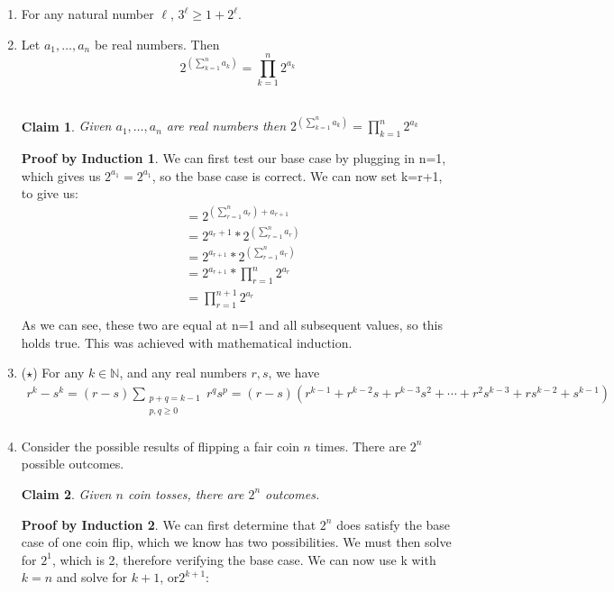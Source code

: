 \documentclass[11pt]{letter}
\newtheorem{claim}{Claim}
\theoremstyle{definition}
\newtheorem{PBI}{Proof by Induction}
\begin{document}
\begin{description}
\begin{enumerate}
			\item For any natural number $\ell$, $3^\ell\geq 1+2^\ell$.
			\item Let $a_1,\ldots, a_n$ be real numbers. Then
				$$2^{\left(\sum_{k=1}^n a_k\right)}=\prod_{k=1}^n 2^{a_k}$$ \\
\begin{claim}
Given $a_1,\ldots, a_n$ are real numbers then $2^{\left(\sum_{k=1}^n a_k\right)}=\prod_{k=1}^n 2^{a_k}$ \\
\end{claim}
\begin{PBI}
We can first test our base case by plugging in n=1, which gives us $2^{a_1}=2^{a_1}$, so the base case is correct. We can now set k=r+1, to give us: \\
\begin{align*}
&=2^{\left(\sum_{r=1}^n a_{r}\right) +a_{r+1}} \tag{replaces k with r+1} \\
&=2^{a_r+1}*2^{\left(\sum_{r=1}^n a_{r}\right)} \\
&=2^{a_{r+1}}*2^{\left(\sum_{r=1}^n a_{r}\right)} \\
&=2^{a_{r+1}}*\prod_{r=1}^n 2^{a_r} \\
&=\prod_{r=1}^{n+1} 2^{a_r} \\
\end{align*}
As we can see, these two are equal at n=1 and all subsequent values, so this holds true. This was achieved with mathematical induction. \\
\end{PBI}
			\item ($\star$) For any $k\in\mathbb{N}$, and any real numbers $r,s$, we have 
				\begin{align*}
					r^k-s^k=(r-s)\sum_{\substack{p+q=k-1\\p,q\geq 0}} r^qs^p=(r-s)\left(r^{k-1}+r^{k-2}s+r^{k-3}s^2+\cdots+r^2s^{k-3}+rs^{k-2}+s^{k-1}\right) \\
				\end{align*}
			\item Consider the possible results of flipping a fair coin $n$ times. There are $2^n$ possible outcomes. 
\begin{claim}
Given $n$ coin tosses, there are $2^n$ outcomes.
\end{claim}
\begin{PBI}
We can first determine that $2^n$ does satisfy the base case of one coin flip, which we know has two possibilities. We must then solve for $2^1$, which is 2, therefore verifying the base case. We can now use k with $k=n$ and solve for $k+1$, or$2^{k+1}$:\\

\end{PBI}
\end{enumerate}
\end{description}
\end{document}
